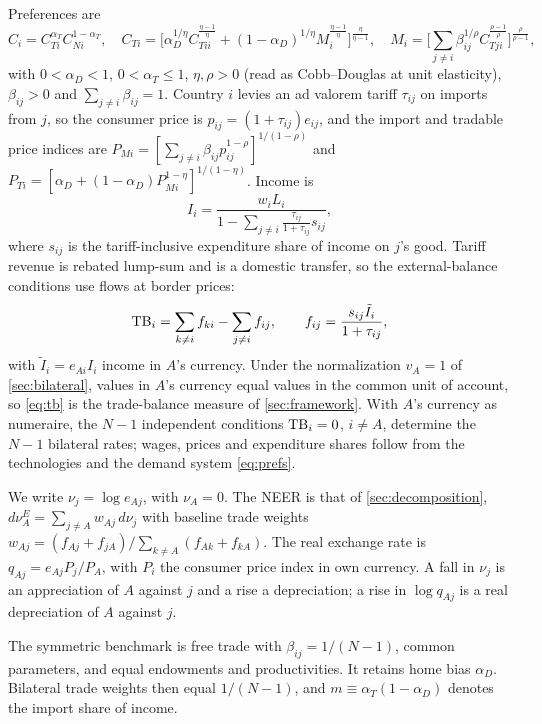 Preferences are
\begin{equation}
C_i=C_{Ti}^{\alpha_T}C_{Ni}^{1-\alpha_T},\quad
C_{Ti}=\Big[\alpha_D^{1/\eta}C_{Tii}^{\frac{\eta-1}{\eta}}+(1-\alpha_D)^{1/\eta}M_i^{\frac{\eta-1}{\eta}}\Big]^{\frac{\eta}{\eta-1}},\quad
M_i=\Big[\textstyle\sum_{j\neq i}\beta_{ij}^{1/\rho}C_{Tji}^{\frac{\rho-1}{\rho}}\Big]^{\frac{\rho}{\rho-1}},
\label{eq:prefs}
\end{equation}
with $0<\alpha_D<1$, $0<\alpha_T\leq1$, $\eta,\rho>0$ (read as Cobb--Douglas at unit elasticity), $\beta_{ij}>0$ and $\sum_{j\neq i}\beta_{ij}=1$. Country $i$ levies an ad valorem tariff $\tau_{ij}$ on imports from $j$, so the consumer price is $p_{ij}=(1+\tau_{ij})e_{ij}$, and the import and tradable price indices are $P_{Mi}=[\sum_{j\neq i}\beta_{ij}p_{ij}^{1-\rho}]^{1/(1-\rho)}$ and $P_{Ti}=[\alpha_D+(1-\alpha_D)P_{Mi}^{1-\eta}]^{1/(1-\eta)}$. Income is
\begin{equation}
I_i=\frac{w_iL_i}{1-\sum_{j\neq i}\frac{\tau_{ij}}{1+\tau_{ij}}s_{ij}},
\label{eq:income}
\end{equation}
where $s_{ij}$ is the tariff-inclusive expenditure share of income on $j$'s good. Tariff revenue is rebated lump-sum and is a domestic transfer, so the external-balance conditions use flows at border prices:
\begin{equation}
\mathrm{TB}_i=\sum_{k\neq i}f_{ki}-\sum_{j\neq i}f_{ij},\qquad f_{ij}=\frac{s_{ij}\tilde I_i}{1+\tau_{ij}},
\label{eq:tb}
\end{equation}
with $\tilde I_i=e_{Ai}I_i$ income in $A$'s currency. Under the normalization $v_A=1$ of \cref{sec:bilateral}, values in $A$'s currency equal values in the common unit of account, so \cref{eq:tb} is the trade-balance measure of \cref{sec:framework}. With $A$'s currency as numeraire, the $N-1$ independent conditions $\mathrm{TB}_i=0$, $i\neq A$, determine the $N-1$ bilateral rates; wages, prices and expenditure shares follow from the technologies and the demand system \cref{eq:prefs}.

We write $\nu_j=\log e_{Aj}$, with $\nu_A=0$. The NEER is that of \cref{sec:decomposition}, $d\nu^E_A=\sum_{j\neq A}w_{Aj}\,d\nu_j$ with baseline trade weights $w_{Aj}=(f_{Aj}+f_{jA})/\sum_{k\neq A}(f_{Ak}+f_{kA})$. The real exchange rate is $q_{Aj}=e_{Aj}P_j/P_A$, with $P_i$ the consumer price index in own currency. A fall in $\nu_j$ is an appreciation of $A$ against $j$ and a rise a depreciation; a rise in $\log q_{Aj}$ is a real depreciation of $A$ against $j$.

The symmetric benchmark is free trade with $\beta_{ij}=1/(N-1)$, common parameters, and equal endowments and productivities. It retains home bias $\alpha_D$. Bilateral trade weights then equal $1/(N-1)$, and $m\equiv\alpha_T(1-\alpha_D)$ denotes the import share of income.

